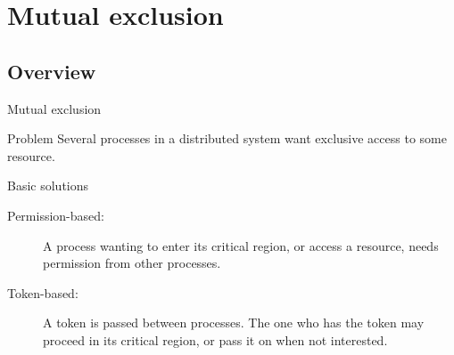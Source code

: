 \section{Mutual exclusion}
\subsection{Overview}
\begin{slide}{Mutual exclusion}
  \begin{alertblock}{Problem}
    Several processes in a distributed system want exclusive access to some resource.
  \end{alertblock}
  \begin{block}{Basic solutions}
    \begin{description}
      \item[Permission-based:] A process wanting to enter its critical region, or access a resource, needs
        permission from other processes.
      \item[Token-based:] A token is passed between processes. The one who has the token may proceed in its
        critical region, or pass it on when not interested.
    \end{description}
  \end{block}
\end{slide}
